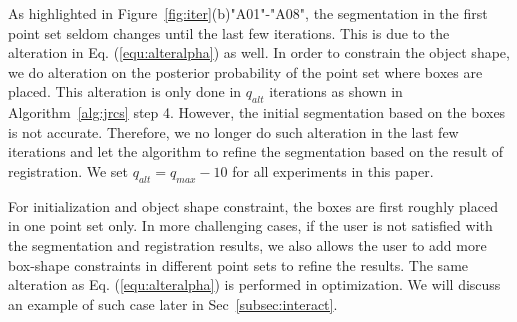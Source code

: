 As highlighted in Figure~\ref{fig:iter}(b)"A01"-"A08", the segmentation in the first point set seldom changes until the last few iterations. 
%
This is due to the alteration in Eq. (\ref{equ:alteralpha}) as well. 
%
In order to constrain the object shape, we do alteration on the posterior probability of the point set where boxes are placed. This alteration is only done in $q_{alt}$ iterations as shown in Algorithm~\ref{alg:jrcs} step 4. 
However, the initial segmentation based on the boxes is not accurate. 
Therefore, we no longer do such alteration in the last few iterations and let the algorithm to refine the segmentation based on the result of registration. 
We set $q_{alt}=q_{max}-10$ for all experiments in this paper.

For initialization and object shape constraint, the boxes are first roughly placed in one point set only. 
In more challenging cases, if the user is not satisfied with the segmentation and registration results, we also allows the user to add more box-shape constraints in different point sets to refine the results.
The same alteration as Eq. (\ref{equ:alteralpha}) is performed in optimization. We will discuss an example of such case later in Sec~\ref{subsec:interact}.